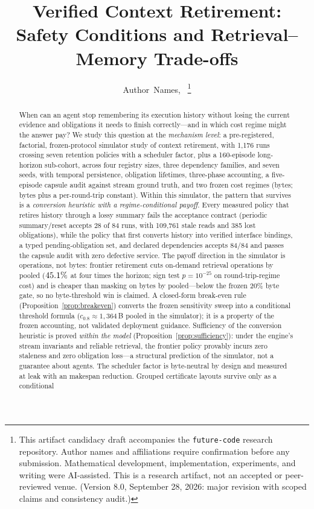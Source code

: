 \documentclass[journal]{IEEEtran}
\title{Verified Context Retirement: Safety Conditions and Retrieval--Memory Trade-offs}
\author{Author~Names,~\IEEEmembership{Member,~IEEE}
\thanks{This artifact candidacy draft accompanies the \texttt{future-code} research repository. Author names and affiliations require confirmation before any submission. Mathematical development, implementation, experiments, and writing were AI-assisted. This is a research artifact, not an accepted or peer-reviewed venue. (Version 8.0, September 28, 2026: major revision with scoped claims and consistency audit.)}}
\theoremstyle{definition}\newtheorem{definition}[theorem]{Definition}
\theoremstyle{remark}\newtheorem{remark}[theorem]{Remark}
\begin{document}
\maketitle
\begin{abstract}
When can an agent stop remembering its execution history without
losing the current evidence and obligations it needs to finish
correctly---and in which cost regime might the answer pay? We study
this question at the \emph{mechanism level}: a pre-registered,
factorial, frozen-protocol simulator study of context retirement,
with 1{,}176 runs crossing seven retention policies with a scheduler
factor, plus a 160-episode long-horizon sub-cohort, across four
registry sizes, three dependency families, and seven seeds, with
temporal persistence, obligation lifetimes, three-phase accounting, a
five-episode capsule audit against stream ground truth, and two frozen
cost regimes (bytes; bytes plus a per-round-trip constant). Within
this simulator, the pattern that survives is a \emph{conversion
heuristic with a regime-conditional payoff}. Every measured policy
that retires history through a lossy summary fails the acceptance
contract (periodic summary/reset accepts 28 of 84 runs, with
109{,}761 stale reads and 385 lost obligations), while the policy that
first converts history into verified interface bindings, a typed
pending-obligation set, and declared dependencies accepts 84/84 and
passes the capsule audit with zero defective service. The payoff
direction in the simulator is operations, not bytes: frontier
retirement cuts on-demand retrieval operations by \RetwoOpsReduction{}
pooled ($45.1\%{}$ at four times the horizon; sign
test $p{=}10^{-25}$ on round-trip-regime cost) and is cheaper than
masking on bytes by \RetwoBytesWin{} pooled---below the frozen 20\%
byte gate, so no byte-threshold win is claimed. A closed-form
break-even rule (Proposition~\ref{prop:breakeven}) converts the frozen
sensitivity sweep into a conditional threshold formula
($c_{0.8}\approx1{,}364$\,B pooled in the simulator); it is a property
of the frozen accounting, not validated deployment guidance.
Sufficiency of the conversion heuristic is proved \emph{within the
model} (Proposition~\ref{prop:sufficiency}): under the engine's stream
invariants and reliable retrieval, the frontier policy provably
incurs zero staleness and zero obligation loss---a structural
prediction of the simulator, not a guarantee about agents. The
scheduler factor is byte-neutral by design and measured at
\RetwoSEffectOnBytes{} leak with an \RetwoMakespanReduction{} makespan
reduction. Grouped certificate layouts survive only as a conditional

\end{abstract}
\end{document}
